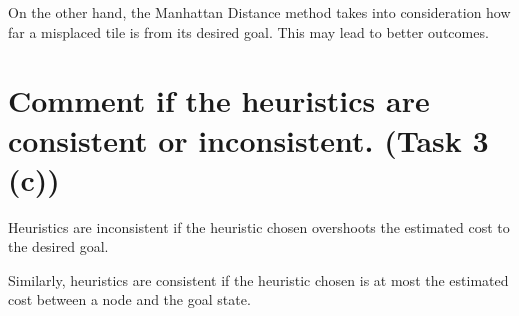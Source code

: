 \documentclass[11pt]{article}
\begin{document}
On the other hand, the Manhattan Distance method takes into consideration how far a misplaced tile is from its desired goal. This may lead to better outcomes.

\newpage
\section{Comment if the heuristics are consistent or inconsistent. (Task 3 (c))}
Heuristics are inconsistent if the heuristic chosen overshoots the estimated cost to the desired goal.

Similarly, heuristics are consistent if the heuristic chosen is at most the estimated cost between a node and the goal state.
\end{document}
